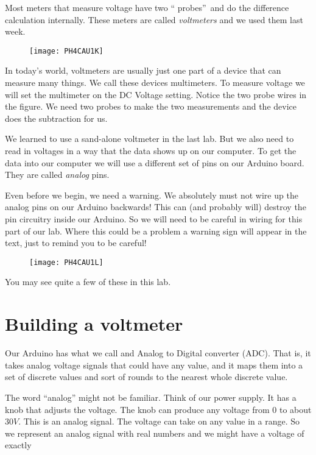 Most meters that measure voltage have two \textquotedblleft
probes\textquotedblright\ and do the difference calculation internally.
These meters are called \emph{voltmeters} and we used them last week.

\begin{figure}[h!]
	\centering
	\texttt{[image: PH4CAU1K]}
\end{figure}

In today's world, voltmeters are usually just one part of a device that can
measure many things. We call these devices multimeters. To measure voltage
we will set the multimeter on the DC Voltage setting. Notice the two probe
wires in the figure. We need two probes to make the two measurements and the
device does the subtraction for us.

We learned to use a sand-alone voltmeter in the last lab. But we also need
to read in voltages in a way that the data shows up on our computer. To get
the data into our computer we will use a different set of pins on our
Arduino board. They are called \emph{analog} pins.

Even before we begin, we need a warning. We absolutely must not wire up the
analog pins on our Arduino backwards! This can (and probably will) destroy
the pin circuitry inside our Arduino. So we will need to be careful in
wiring for this part of our lab. Where this could be a problem a warning
sign will appear in the text, just to remind you to be careful! 

\begin{figure}[h!]
	\centering
	\texttt{[image: PH4CAU1L]}
\end{figure}

You may see quite a few of these in this lab.

\section{Building a voltmeter}

Our Arduino has what we call and Analog to Digital converter (ADC). That is,
it takes analog voltage signals that could have any value, and it maps them
into a set of discrete values and sort of rounds to the nearest whole
discrete value.

The word ``analog'' might not be familiar.
Think of our power supply. It has a knob that adjusts the voltage. The knob
can produce any voltage from $0$ to about $30\unit{V}$. This is an analog
signal. The voltage can take on any value in a range. So we represent an
analog signal with real numbers and we might have a voltage of exactly 

